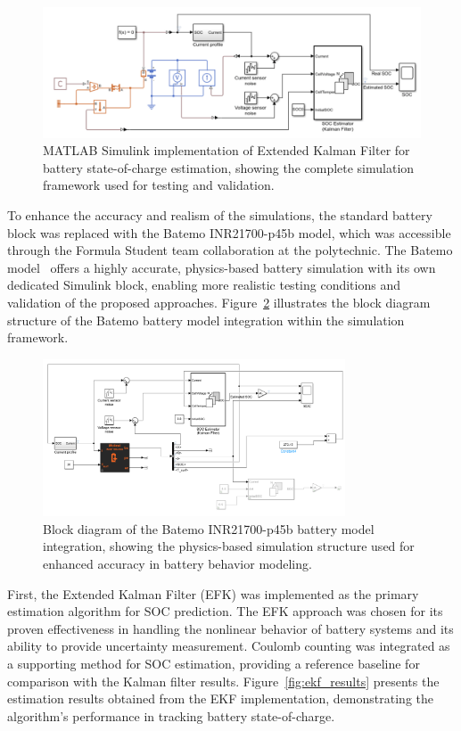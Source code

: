 \begin{figure}[htbp]
\centering
\includegraphics[width=1\textwidth]{imgs/simulink_EKF.png}
\caption{MATLAB Simulink implementation of Extended Kalman Filter for battery state-of-charge estimation, showing the complete simulation framework used for testing and validation.}
\label{fig:simulink_ekf_implementation}
\end{figure}

To enhance the accuracy and realism of the simulations, the standard battery block was replaced with the Batemo INR21700-p45b model, which was accessible through the Formula Student team collaboration at the polytechnic. The Batemo model~\cite{batemo_website_2024} offers a highly accurate, physics-based battery simulation with its own dedicated Simulink block, enabling more realistic testing conditions and validation of the proposed approaches. Figure~\ref{fig:batemo_blocks} illustrates the block diagram structure of the Batemo battery model integration within the simulation framework.

\begin{figure}[htbp]
\centering
\includegraphics[width=0.8\textwidth]{imgs/batemo_blocks.png}
\caption{Block diagram of the Batemo INR21700-p45b battery model integration, showing the physics-based simulation structure used for enhanced accuracy in battery behavior modeling.}
\label{fig:batemo_blocks}
\end{figure}

First, the Extended Kalman Filter (EFK) was implemented as the primary estimation algorithm for SOC prediction. The EFK approach was chosen for its proven effectiveness in handling the nonlinear behavior of battery systems and its ability to provide uncertainty measurement. Coulomb counting was integrated as a supporting method for SOC estimation, providing a reference baseline for comparison with the Kalman filter results. Figure~\ref{fig:ekf_results} presents the estimation results obtained from the EKF implementation, demonstrating the algorithm's performance in tracking battery state-of-charge.

